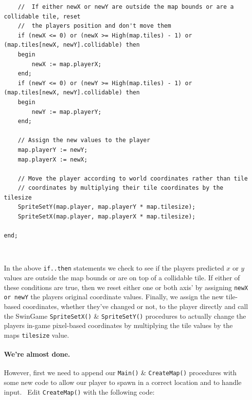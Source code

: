\documentclass{article}
\begin{document}
 \begin{mdframed}[backgroundcolor=darkgray]
 \begin{verbatim}
	//	If either newX or newY are outside the map bounds or are a collidable tile, reset
	//	the players position and don't move them
	if (newX <= 0) or (newX >= High(map.tiles) - 1) or (map.tiles[newX, newY].collidable) then
	begin
		newX := map.playerX;
	end;
	if (newY <= 0) or (newY >= High(map.tiles) - 1) or (map.tiles[newX, newY].collidable) then
	begin
		newY := map.playerY;
	end;

	// Assign the new values to the player
	map.playerY := newY;
	map.playerX := newX;

	// Move the player according to world coordinates rather than tile
	// coordinates by multiplying their tile coordinates by the tilesize
	SpriteSetY(map.player, map.playerY * map.tilesize);
	SpriteSetX(map.player, map.playerX * map.tilesize);

end;
 \end{verbatim}
 \end{mdframed}

\

In the above \texttt{if..then} statements we check to see if the players predicted $x$ or $y$ values are outside the map bounds or are on top of a collidable tile. If either of these conditions are true, then we reset either one or both axis' by assigning \texttt{newX or newY} the players original coordinate values. Finally, we assign the new tile-based coordinates, whether they've changed or not, to the player directly and call the SwinGame \texttt{SpriteSetX()} \& \texttt{SpriteSetY()} procedures to actually change the players in-game pixel-based coordinates by multiplying the tile values by the maps \texttt{tilesize} value.

\paragraph{We're almost done.} However, first we need to append our \texttt{Main()} \& \texttt{CreateMap()} procedures with some new code to allow our player to spawn in a correct location and to handle input.
\
Edit \texttt{CreateMap()} with the following code:
\
\vspace{0.5cm}
\end{document}
